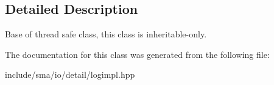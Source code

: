 \subsection{Detailed Description}
Base of thread safe class, this class is inheritable-\/only. 

The documentation for this class was generated from the following file\-:\begin{DoxyCompactItemize}
\item 
include/sma/io/detail/logimpl.\-hpp\end{DoxyCompactItemize}
